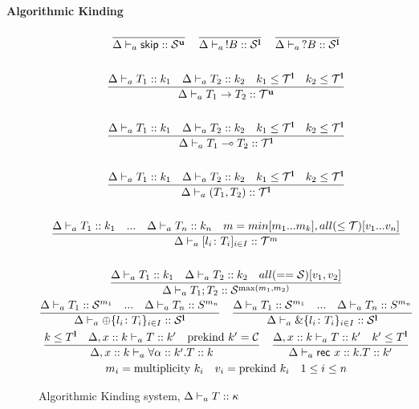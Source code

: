 \documentclass[12pt,openright,twoside]{report}
\begin{document}
\textbf{Algorithmic Kinding} 
\begin{figure}[ht]
\centering
  \begin{gather*}
	\frac{}{\Delta \vdash_{a} \mathsf{skip} :: \mathcal S^{\mathbf{u}}} \quad
	\frac{}{\Delta \vdash_{a} \,!B :: \mathcal S^{\mathbf{l}}} \quad \frac{}{\Delta
			\vdash_{a} \,?B :: \mathcal S^{\mathbf{l}}}
    \\\\
    \frac{\Delta \vdash_{a} T_1 :: k_1 \quad \Delta \vdash_{a} T_2 :: k_2 \quad k_1 \le \mathcal T^{\mathbf{l}} \quad k_2 \le \mathcal T^{\mathbf{l}}}
    	{\Delta \vdash_{a} T_1 \to T_2 :: \mathcal T^{\mathbf{u}}}	
	\\\\
    \frac{\Delta \vdash_{a} T_1 :: k_1 \quad \Delta \vdash_{a} T_2 :: k_2 \quad k_1 \le \mathcal T^{\mathbf{l}} \quad k_2 \le \mathcal T^{\mathbf{l}}}
    	{\Delta \vdash_{a} T_1 \multimap T_2 :: \mathcal T^{\mathbf{l}}}	
    \\\\
    \frac{\Delta \vdash_{a} T_1 :: k_1 \quad \Delta \vdash_{a} T_2 :: k_2 \quad k_1 \le \mathcal T^{\mathbf{l}} \quad k_2 \le \mathcal T^{\mathbf{l}}}
    	{\Delta \vdash_{a} (T_1,T_2) :: \mathcal T^{\mathbf{l}}}	
    \\\\
    \frac{\Delta \vdash_{a} T_1 :: k_1 \quad...\quad \Delta \vdash_{a} T_n :: k_n \quad 
    		m=min[m_1 ... m_k], all(\le \mathcal T)[v_1 ... v_n]}
    	{\Delta \vdash_{a} [l_i\colon T_i]_{i\in I} :: \mathcal T^m}	
	\\\\
	\frac{\Delta \vdash_{a} T_1 :: k_1 \quad \Delta \vdash_{a} T_2 :: k_2 \quad all(== \mathcal S)[v_1,v_2]}
    	{\Delta \vdash_{a} T_1;T_2 :: \mathcal S^{\max(m_1, m_2)}}	    
	\\
		\frac{\Delta \vdash_{a} T_1 :: \mathcal S^{m_1} \quad \mbox{...} \quad \Delta \vdash_{a} T_n :: S^{m_n}}{
      \Delta \vdash_{a} \oplus\{l_i\colon T_i\}_{i\in I} :: \mathcal S^{\mathbf{l}}}
    \quad
    \frac{\Delta \vdash_{a} T_1 :: \mathcal S^{m_1} \quad \mbox{...} \quad \Delta \vdash_{a} T_n :: S^{m_n}}
    { \Delta \vdash_{a} \&\{l_i\colon T_i\}_{i\in I} :: \mathcal S^{\mathbf{l}}}
	\\
	 \frac{k \le T^{\mathbf{l}} \quad \Delta, x :: k \vdash_{a} T :: k' \quad \mbox{prekind } k' = \mathcal C}
    { \Delta, x :: k \vdash_{a} \forall \alpha :: k'.T :: k}
	\quad
	\frac{\Delta, x :: k \vdash_{a} T :: k' \quad k' \le T^{\mathbf{l}}}
	    { \Delta \vdash_{a} \mathsf{rec} \mbox{ } x :: k.T :: k'}
	 \\	
	m_i = \mbox{multiplicity } k_i \quad v_i = \mbox{prekind } k_i \quad 1 \le i \le n 
	\end{gather*}
  \caption{Algorithmic Kinding system, $\Delta \vdash_{a} T :: \kappa$}
  \label{fig:kinding}
\end{figure}
%



\end{document}
